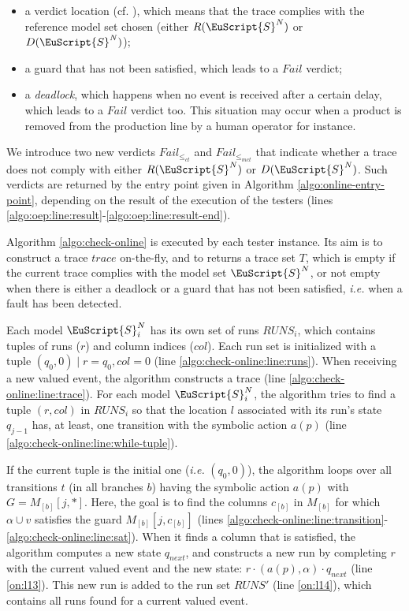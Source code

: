 \begin{itemize}
    \item a verdict location (cf.
        ), which means
        that the trace complies with the reference model set
        chosen (either $R(\EuScript{S}^N)$ or
        $D(\EuScript{S}^N)$);

    \item a guard that has not been satisfied, which leads to a
        $Fail$ verdict;

    \item a \emph{deadlock}, which happens when no event is
        received after a certain delay, which leads to a $Fail$
        verdict too. This situation may occur when a product is
        removed from the production line by a human operator for
        instance.
\end{itemize}

We introduce two new verdicts $Fail_{\leq_{ct}}$ and
$Fail_{\leq_{mct}}$ that indicate whether a trace does not comply
with either $R(\EuScript{S}^N)$ or $D(\EuScript{S}^N)$. Such
verdicts are returned by the entry point given in Algorithm
\ref{algo:online-entry-point}, depending on the result of the
execution of the testers (lines
\ref{algo:oep:line:result}-\ref{algo:oep:line:result-end}).

Algorithm \ref{algo:check-online} is executed by each tester
instance. Its aim is to construct a trace $trace$ on-the-fly, and
to returns a trace set $T$, which is empty if the current trace
complies with the model set $\EuScript{S}^N$, or not empty when
there is either a deadlock or a guard that has not been
satisfied, \emph{i.e.} when a fault has been detected.

Each model $\EuScript{S}_i^N$ has its own set of runs $RUNS_i$,
which contains tuples of runs ($r$) and column indices ($col$).
Each run set is initialized with a tuple $(q_0, 0) \mid r = q_0,
col = 0$ (line \ref{algo:check-online:line:runs}). When receiving
a new valued event, the algorithm constructs a trace (line
\ref{algo:check-online:line:trace}). For each model
$\EuScript{S}_i^N$, the algorithm tries to find a tuple $(r,
col)$ in $RUNS_i$ so that the location $l$ associated with its
run's state $q_{j - 1}$ has, at least, one transition with the
symbolic action $a(p)$ (line
\ref{algo:check-online:line:while-tuple}).

If the current tuple is the initial one (\emph{i.e.} $(q_0, 0)$),
the algorithm loops over all transitions $t$ (in all branches
$b$) having the symbolic action $a(p)$ with $G = M_{[b]}[j, *]$.
Here, the goal is to find the columns $c_{[b]}$ in $M_{[b]}$ for
which $\alpha \cup v$ satisfies the guard $M_{[b]}[j, c_{[b]}]$
(lines
\ref{algo:check-online:line:transition}-\ref{algo:check-online:line:sat}).
When it finds a column that is satisfied, the algorithm computes
a new state $q_{next}$, and constructs a new run by completing
$r$ with the current valued event and the new state: $r \cdot
(a(p), \alpha) \cdot q_{next}$ (line \ref{on:l13}). This new run is added
to the run set $RUNS'$ (line \ref{on:l14}), which contains all runs found
for a current valued event.

